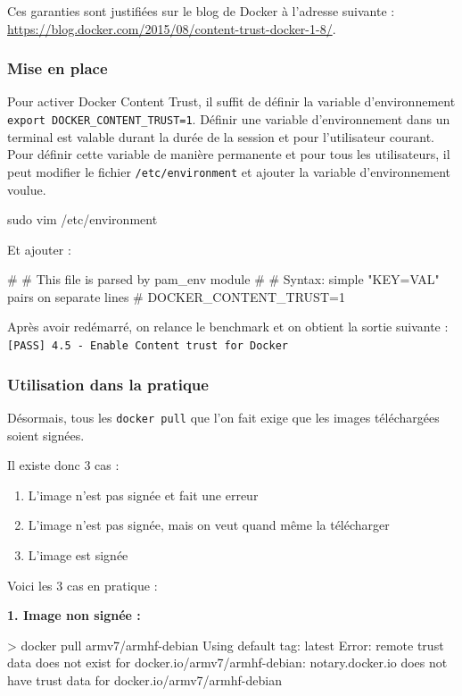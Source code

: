 \documentclass[11pt,a4paper,oneside]{report}
\newcommand{\code}[1]{\texttt{#1}}
\begin{document}
Ces garanties sont justifiées sur le blog de Docker à l'adresse suivante : \url{https://blog.docker.com/2015/08/content-trust-docker-1-8/}.

\subsubsection{Mise en place}
Pour activer Docker Content Trust, il suffit de définir la variable d'environnement \linebreak \code{export DOCKER\_CONTENT\_TRUST=1}. Définir une variable d'environnement dans un terminal est valable durant la durée de la session et pour l'utilisateur courant. Pour définir cette variable de manière permanente et pour tous les utilisateurs, il peut modifier le fichier \code{/etc/environment} et ajouter la variable d'environnement voulue.

\begin{bashcode}
sudo vim /etc/environment
\end{bashcode}

Et ajouter :
\begin{bashcode}
#
# This file is parsed by pam_env module
#
# Syntax: simple "KEY=VAL" pairs on separate lines
#
DOCKER_CONTENT_TRUST=1
\end{bashcode}

Après avoir redémarré, on relance le benchmark et on obtient la sortie suivante : \code{[PASS] 4.5  - Enable Content trust for Docker}

\subsubsection{Utilisation dans la pratique}
Désormais, tous les \code{docker pull} que l'on fait exige que les images téléchargées soient signées.

Il existe donc 3 cas :
\begin{enumerate}
\item L'image n'est pas signée et fait une erreur
\item L'image n'est pas signée, mais on veut quand même la télécharger
\item L'image est signée
\end{enumerate}

Voici les 3 cas en pratique :

\textbf{1. Image non signée :}
\begin{textcode}
> docker pull armv7/armhf-debian
Using default tag: latest
Error: remote trust data does not exist for docker.io/armv7/armhf-debian: notary.docker.io does not have trust data for docker.io/armv7/armhf-debian
\end{textcode}
\end{document}
